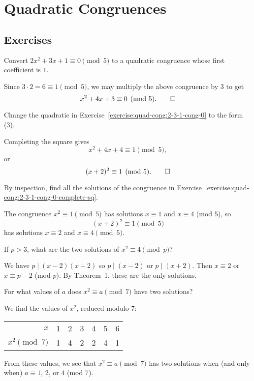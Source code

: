 \chapter{Quadratic Congruences}

\section{Exercises}

\label{exercise:quad-cong:2-3-1-cong-0}
Convert $2x^2 + 3x + 1 \equiv 0\pmod5$ to a quadratic congruence whose
first coefficient is $1$.
\begin{solution}
  Since $3\cdot2 = 6\equiv1\pmod5$, we may multiply the above
  congruence by $3$ to get
  \begin{equation*}
    x^2 + 4x + 3\equiv0\pmod5. \qedhere
  \end{equation*}
\end{solution}

\label{exercise:quad-cong:2-3-1-cong-0-complete-sq}
Change the quadratic in Exercise~\ref{exercise:quad-cong:2-3-1-cong-0}
to the form (3).
\begin{solution}
  Completing the square gives
  \begin{equation*}
    x^2 + 4x + 4 \equiv 1\pmod5,
  \end{equation*}
  or
  \begin{equation*}
    (x + 2)^2 \equiv 1\pmod5. \qedhere
  \end{equation*}
\end{solution}

 By inspection, find all the solutions of the congruence in
Exercise~\ref{exercise:quad-cong:2-3-1-cong-0-complete-sq}.
\begin{solution}
  The congruence $x^2\equiv1\pmod5$ has solutions $x\equiv1$ and
  $x\equiv4$ (mod $5$), so
  \begin{equation*}
    (x + 2)^2\equiv1\pmod5
  \end{equation*}
  has solutions $x\equiv2$ and $x\equiv4\pmod5$.
\end{solution}

 If $p > 3$, what are the two solutions of
$x^2\equiv4\pmod{p}$?
\begin{solution}
  We have $p\mid(x-2)(x+2)$ so $p\mid(x-2)$ or $p\mid(x+2)$. Then
  $x\equiv2$ or $x\equiv p-2$ (mod $p$). By Theorem~1, these are the
  only solutions.
\end{solution}

 For what values of $a$ does $x^2\equiv a\pmod7$ have two
solutions?
\begin{solution}
  We find the values of $x^2$, reduced modulo $7$:
  \begin{center}
    \begin{tabular}{r|cccccc}
      $x$ & 1 & 2 & 3 & 4 & 5 & 6 \\
      $x^2\pmod7$ & 1 & 4 & 2 & 2 & 4 & 1
    \end{tabular}
  \end{center}
  From these values, we see that $x^2\equiv a\pmod7$ has two solutions
  when (and only when) $a\equiv1$, $2$, or $4$ (mod $7$).
\end{solution}

